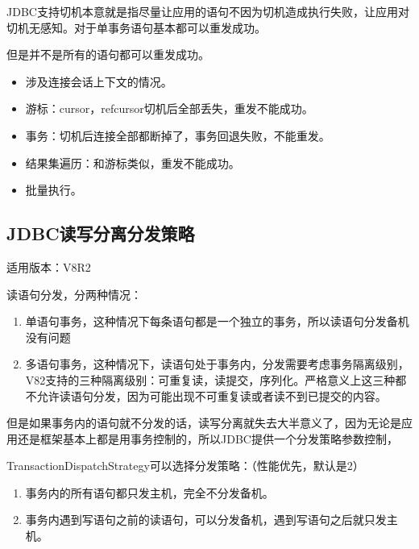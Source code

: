 \documentclass[letterpaper,10pt,english]{sphinxmanual}
\begin{document}
JDBC支持切机本意就是指尽量让应用的语句不因为切机造成执行失败，让应用对切机无感知。对于单事务语句基本都可以重发成功。

但是并不是所有的语句都可以重发成功。
\begin{itemize}
\item {} 
涉及连接会话上下文的情况。

\item {} 
游标：cursor，refcursor切机后全部丢失，重发不能成功。

\item {} 
事务：切机后连接全部都断掉了，事务回退失败，不能重发。

\item {} 
结果集遍历：和游标类似，重发不能成功。

\item {} 
批量执行。

\end{itemize}


\subsection{JDBC读写分离分发策略}
\label{\detokenize{interface/jdbc:id9}}
适用版本：V8R2

读语句分发，分两种情况：
\begin{enumerate}
%
\item {} 
单语句事务，这种情况下每条语句都是一个独立的事务，所以读语句分发备机没有问题

\item {} 
多语句事务，这种情况下，读语句处于事务内，分发需要考虑事务隔离级别，V82支持的三种隔离级别：可重复读，读提交，序列化。严格意义上这三种都不允许读语句分发，因为可能出现不可重复读或者读不到已提交的内容。

\end{enumerate}

但是如果事务内的语句就不分发的话，读写分离就失去大半意义了，因为无论是应用还是框架基本上都是用事务控制的，所以JDBC提供一个分发策略参数控制，

TransactionDispatchStrategy可以选择分发策略：（性能优先，默认是2）
\begin{enumerate}
%
\item {} 
事务内的所有语句都只发主机，完全不分发备机。

\item {} 
事务内遇到写语句之前的读语句，可以分发备机，遇到写语句之后就只发主机。

\end{enumerate}
\end{document}
